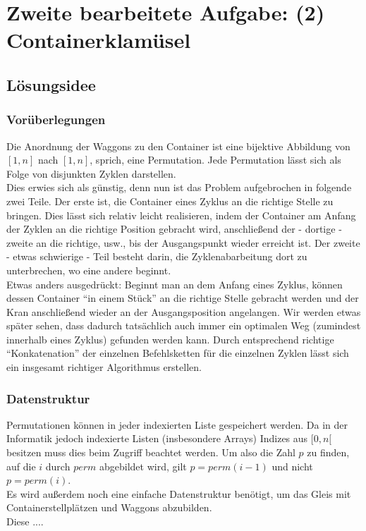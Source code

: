\section{Zweite bearbeitete Aufgabe: (2) Containerklamüsel}
\subsection{Lösungsidee}
\subsubsection{Vorüberlegungen}
Die Anordnung der Waggons zu den Container ist eine bijektive Abbildung von $[1,n]$ nach $[1,n]$, sprich, eine Permutation.
Jede Permutation lässt sich als Folge von disjunkten Zyklen darstellen. \\ %
Dies erwies sich als günstig, denn nun ist das Problem aufgebrochen in folgende zwei Teile.
Der erste ist, die Container eines Zyklus an die richtige Stelle zu bringen.
Dies lässt sich relativ leicht realisieren, indem der Container am Anfang der Zyklen an die richtige Position gebracht wird, anschließend der - dortige - zweite an die richtige, usw., bis der Ausgangspunkt wieder erreicht ist.
Der zweite - etwas schwierige - Teil besteht darin, die Zyklenabarbeitung dort zu unterbrechen, wo eine andere beginnt. \\
Etwas anders ausgedrückt:
Beginnt man an dem Anfang eines Zyklus, können dessen Container ``in einem Stück'' an die richtige Stelle gebracht werden und der Kran anschließend wieder an der Ausgangsposition angelangen.
Wir werden etwas später sehen, dass dadurch tatsächlich auch immer ein optimalen Weg (zumindest innerhalb eines Zyklus) gefunden werden kann.
Durch entsprechend richtige ``Konkatenation'' der einzelnen Befehlsketten für die einzelnen Zyklen lässt sich ein insgesamt richtiger Algorithmus erstellen.
\subsubsection{Datenstruktur}
Permutationen können in jeder indexierten Liste gespeichert werden.
Da in der Informatik jedoch indexierte Listen (insbesondere Arrays) Indizes aus $[0,n[$ besitzen muss dies beim Zugriff beachtet werden.
Um also die Zahl $p$ zu finden, auf die $i$ durch $perm$ abgebildet wird, gilt $p = perm(i-1)$ und nicht $p = perm(i)$. \\
Es wird außerdem noch eine einfache Datenstruktur benötigt, um das Gleis mit Containerstellplätzen und Waggons abzubilden. \\
Diese ....
